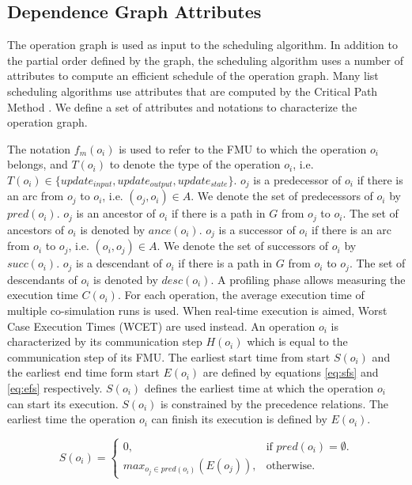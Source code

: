 \subsection{Dependence Graph Attributes}

The operation graph is used as input to the scheduling algorithm. In addition to the partial order defined by the graph, the scheduling algorithm uses a number of attributes to compute an efficient schedule of the operation graph. Many list scheduling algorithms use attributes that are computed by the Critical Path Method \cite{kohler:1975}. We define a set of attributes and notations to characterize the operation graph.

The notation $f_m(o_i)$ is used to refer to the FMU to which the operation $o_i$ belongs, and $T(o_i)$ to denote the type of the operation $o_i$, i.e. $T(o_i) \in \{update_{input}, update_{output}, update_{state}\}$. $o_j$ is a predecessor of $o_i$ if there is an arc from $o_j$ to $o_i$, i.e. $(o_j, o_i) \in A$. We denote the set of predecessors of $o_i$ by $pred(o_i)$. $o_j$ is an ancestor of $o_i$ if there is a path in $G$ from $o_j$ to $o_i$. The set of ancestors of $o_i$ is denoted by $ance(o_i)$. $o_j$ is a successor of $o_i$ if there is an arc from $o_i$ to $o_j$, i.e. $(o_i, o_j) \in A$. We denote the set of successors of $o_i$ by $succ(o_i)$. $o_j$ is a descendant of $o_i$ if there is a path in $G$ from $o_i$ to $o_j$. The set of descendants of $o_i$ is denoted by $desc(o_i)$. A profiling phase allows measuring the execution time $C(o_i)$. For each operation, the average execution time of multiple co-simulation runs is used. When real-time execution is aimed, Worst Case Execution Times (WCET) are used instead. An operation $o_i$ is characterized by its communication step $H(o_i)$ which is equal to the communication step of its FMU. The earliest start time from start $S(o_i)$ and the earliest end time form start $E(o_i)$ are defined by equations \ref{eq:sfs} and \ref{eq:efs} respectively. $S(o_i)$ defines the earliest time at which the operation $o_i$ can start its execution. $S(o_i)$ is constrained by the precedence relations. The earliest time the operation $o_i$ can finish its execution is defined by $E(o_i)$.

\begin{equation}
S(o_i)=\begin{cases}
    0, & \text{if $pred(o_i)=\emptyset$}.\\
    max_{o_j \in pred(o_i)}(E(o_j)), & \text{otherwise}.
  \end{cases}
	\label{eq:sfs}
\end{equation}

